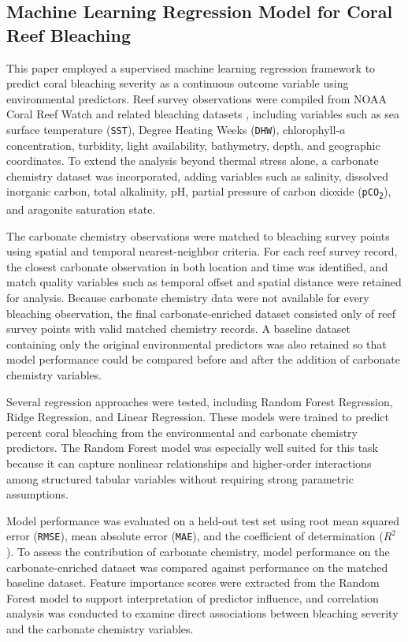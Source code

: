\documentclass[10pt,letterpaper]{article}
\newcounter{assumption}
\newcounter{metric}
\begin{document}
\subsection*{Machine Learning Regression Model for Coral Reef Bleaching}
This paper employed a supervised machine learning regression framework to predict coral bleaching severity as a continuous outcome variable using environmental predictors. Reef survey observations were compiled from NOAA Coral Reef Watch and related bleaching datasets \cite{noaa_crw}, including variables such as sea surface temperature (\texttt{SST}), Degree Heating Weeks (\texttt{DHW}), chlorophyll-$a$ concentration, turbidity, light availability, bathymetry, depth, and geographic coordinates. To extend the analysis beyond thermal stress alone, a carbonate chemistry dataset was incorporated, adding variables such as salinity, dissolved inorganic carbon, total alkalinity, pH, partial pressure of carbon dioxide (\texttt{pCO\textsubscript{2}}), and aragonite saturation state.

The carbonate chemistry observations were matched to bleaching survey points using spatial and temporal nearest-neighbor criteria. For each reef survey record, the closest carbonate observation in both location and time was identified, and match quality variables such as temporal offset and spatial distance were retained for analysis. Because carbonate chemistry data were not available for every bleaching observation, the final carbonate-enriched dataset consisted only of reef survey points with valid matched chemistry records. A baseline dataset containing only the original environmental predictors was also retained so that model performance could be compared before and after the addition of carbonate chemistry variables.

Several regression approaches were tested, including Random Forest Regression, Ridge Regression, and Linear Regression. These models were trained to predict percent coral bleaching from the environmental and carbonate chemistry predictors. The Random Forest model was especially well suited for this task because it can capture nonlinear relationships and higher-order interactions among structured tabular variables without requiring strong parametric assumptions.

Model performance was evaluated on a held-out test set using root mean squared error (\texttt{RMSE}), mean absolute error (\texttt{MAE}), and the coefficient of determination ($R^2$). To assess the contribution of carbonate chemistry, model performance on the carbonate-enriched dataset was compared against performance on the matched baseline dataset. Feature importance scores were extracted from the Random Forest model to support interpretation of predictor influence, and correlation analysis was conducted to examine direct associations between bleaching severity and the carbonate chemistry variables.
\end{document}
